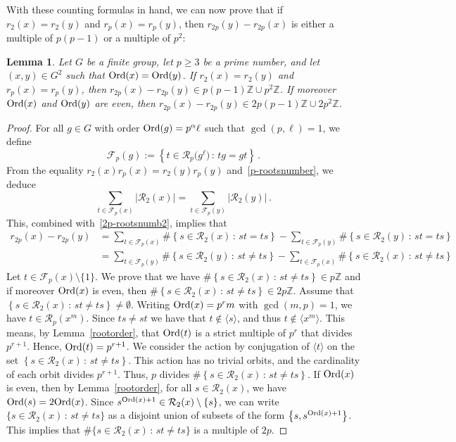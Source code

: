 \documentclass[12pt]{amsart}
\numberwithin{equation}{section}
\newcommand{\Ord}{{\rm Ord}}
\newcommand{\Z}{\mathbb Z}
\newtheorem{lem}[X]{Lemma}
\theoremstyle{definition}
\theoremstyle{remark}
\begin{document}
With these counting formulas in hand, we can now prove that if $r_2(x)=r_2(y)$ and $r_p(x)=r_p(y)$, then $r_{2p}(y)-r_{2p}(x)$ is either a multiple of $p(p-1)$ or a multiple of $p^2$: 
\begin{lem}\label{difference2proots}
    Let $G$ be a finite group, let $p\ge 3$ be a prime number, and let $(x,y)\in G^2$ such that $\Ord(x)=\Ord(y)$. If $r_2(x)=r_2(y)$ and $r_p(x)=r_p(y)$, then $r_{2p}(x)-r_{2p}(y) \in p(p-1)\Z \cup p^2\Z$. If moreover $\Ord(x)$ and $\Ord(y)$ are even, then $r_{2p}(x)-r_{2p}(y) \in 2p(p-1)\Z\cup 2p^2\Z$.
\end{lem}
\begin{proof}
    For all $g\in G$ with order $\Ord(g)=p^\alpha \ell$ such that $\gcd(p,\ell)=1$, we define \[\mathcal{F}_p(g):=\left\{ t\in \mathcal{R}_p\bigl(g^\ell\bigr)\, \colon\,  tg=gt\right\}\, .\]
    From the equality $r_2(x)r_p(x)=r_2(y)r_p(y)$ and~\eqref{p-rootsnumber}, we deduce 
    \[\sum_{t\in \mathcal{F}_p(x)}\left| \mathcal{R}_2(x)\right|=\sum_{t\in\mathcal{F}_p(y)}\left|\mathcal{R}_2(y)\right|\, .\]
    This, combined with~\eqref{2p-rootsnumb2}, implies that
    \begin{align*}
        r_{2p}(x)-r_{2p}(y)&=\sum_{t\in \mathcal{F}_p(x)}\#\left\{s\in \mathcal{R}_2(x)\, \colon\,  st=ts\right\}-\sum_{t\in \mathcal{F}_p(y)}\#\left\{s\in \mathcal{R}_2(y)\, \colon\,  st=ts\right\}\\
        &=\sum_{t\in \mathcal{F}_p(y)}\#\left\{s\in \mathcal{R}_2(y)\, \colon\,  st\ne ts\right\}-\sum_{t\in \mathcal{F}_p(x)}\#\left\{s\in \mathcal{R}_2(x)\, \colon\,  st\ne ts\right\}
    \end{align*}
    Let $t\in \mathcal{F}_p(x)\setminus\{1\}$. We prove that we have $\#\left\{s\in \mathcal{R}_2(x)\, \colon\,  st\ne ts\right\}\in p\Z$ and if moreover $\Ord(x)$ is even, then $\#\left\{s\in \mathcal{R}_2(x)\, \colon\,  st\ne ts\right\}\in 2p\Z$.
    Assume that $\left\{s\in \mathcal{R}_2(x)\, \colon\,  st\ne ts\right\}\ne \emptyset$. Writing $\Ord(x)=p^rm$ with $\gcd(m,p)=1$, we have $t\in \mathcal{R}_{p}(x^m)$. Since $ts\ne st$ we have that $t\notin \langle s\rangle$, and thus $t\notin\langle x^m \rangle$. This means, by Lemma~\ref{rootorder}, that $\Ord(t)$ is a strict multiple of $p^{r}$ that divides $p^{r+1}$. Hence, $\Ord(t)=p^{r+1}$. We consider the action by conjugation of $\langle t\rangle$ on the set $\left\{s\in \mathcal{R}_2(x)\, \colon\,  st\ne ts\right\}$. This action has no trivial orbits, and the cardinality of each orbit divides $p^{r+1}$. Thus, $p$ divides $\#\left\{s\in \mathcal{R}_2(x)\, \colon\,  st\ne ts\right\}$. If $\Ord(x)$ is even, then by Lemma~\ref{rootorder}, for all $s\in \mathcal{R}_2(x)$, we have $\Ord(s)=2\Ord(x)$. Since $s^{\Ord(x)+1}\in \mathcal{R}_2(x)\setminus\{s\}$, we can write $\{s\in \mathcal{R}_2(x)\, \colon\,  st\ne ts\}$ as a disjoint union of subsets of the form $\left\{s,s^{\Ord(x)+1}\right\}$. This implies that $\#\{s\in \mathcal{R}_2(x)\, \colon\,  st\ne ts\}$ is a multiple of $2p$.
    

\end{proof}
\end{document}

